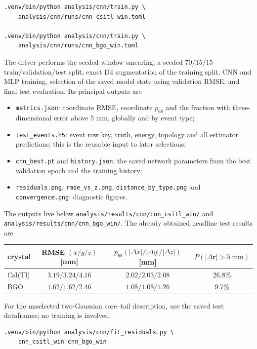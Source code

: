 \documentclass[11pt,a4paper]{article}
\newcommand{\code}[1]{\nolinkurl{#1}}
\newcommand{\csitl}{CsI(Tl)}
\begin{document}
\begin{verbatim}
.venv/bin/python analysis/cnn/train.py \
    analysis/cnn/runs/cnn_csitl_win.toml

.venv/bin/python analysis/cnn/train.py \
    analysis/cnn/runs/cnn_bgo_win.toml
\end{verbatim}

The driver performs the seeded window smearing, a seeded 70/15/15
train/validation/test split, exact D4 augmentation of the training split, CNN
and MLP training, selection of the saved model state using validation RMSE, and final test
evaluation. Its principal outputs are

\begin{itemize}
  \item \code{metrics.json}: coordinate RMSE, coordinate $p_{68}$ and the
  fraction with three-dimensional error above 5 mm, globally and by event type;
  \item \code{test\_events.h5}: event row key, truth, energy, topology and all
  estimator predictions; this is the reusable input to later selections;
  \item \code{cnn\_best.pt} and \code{history.json}: the saved network parameters
  from the best validation epoch and the training history;
  \item \code{residuals.png}, \code{rmse\_vs\_z.png},
  \code{distance\_by\_type.png} and \code{convergence.png}: diagnostic figures.
\end{itemize}

The outputs live below \code{analysis/results/cnn/cnn\_csitl\_win/} and
\code{analysis/results/cnn/cnn\_bgo\_win/}. The already obtained headline
test results are

\begin{center}
\begin{tabular}{lccc}
\toprule
crystal & RMSE $(x/y/z)$ [mm] & $p_{68}(|\Delta x|/|\Delta y|/|\Delta z|)$ [mm]
& $P(|\Delta\mathbf r|>5\ \mathrm{mm})$ \\
\midrule
\csitl{} & $3.19/3.24/4.16$ & $2.02/2.03/2.08$ & 26.8\% \\
BGO      & $1.62/1.62/2.46$ & $1.08/1.08/1.26$ & 9.7\% \\
\bottomrule
\end{tabular}
\end{center}

For the unselected two-Gaussian core--tail description, use the saved
test dataframes; no training is involved:

\begin{verbatim}
.venv/bin/python analysis/cnn/fit_residuals.py \
    cnn_csitl_win cnn_bgo_win
\end{verbatim}
\end{document}
